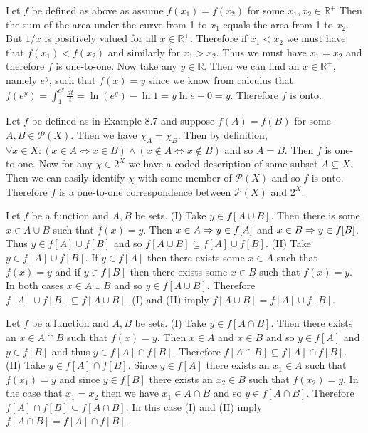 \documentclass[12pt]{book}
\begin{document}
\begin{enumerate}
{Let $f$ be defined as above as assume $f(x_1)=f(x_2)$ for some $x_1,x_2\in\mathbb{R}^+$ Then the sum of the area under the curve from 1 to $x_1$ equals the area from 1 to $x_2$. But $1/x$ is positively valued for all $x\in\mathbb{R}^+$. Therefore if $x_1<x_2$ we must have that $f(x_1)<f(x_2)$ and similarly for $x_1>x_2$. Thus we must have $x_1=x_2$ and therefore $f$ is one-to-one. Now take any $y\in\mathbb{R}$. Then we can find an $x\in\mathbb{R}^+$, namely $e^y$, such that $f(x) = y$ since we know from calculus that $f(e^y) = \int_{1}^{e^y} \frac{dt}{t} = \ln(e^y) - \ln1 = y\ln e - 0 = y$. Therefore $f$ is onto.}

{Let $f$ be defined as in Example 8.7 and suppose $f(A)=f(B)$ for some $A,B\in\mathcal{P}(X)$. Then we have $\chi_A = \chi_B$. Then by definition, $\forall x\in X: (x\in A \iff x\in B)\land (x\notin A \iff x\notin B)$ and so $A=B$. Then $f$ is one-to-one. Now for any $\chi\in 2^X$ we have a coded description of some subset $A\subseteq X$. Then we can easily identify $\chi$ with some member of $\mathcal{P}(X)$ and so $f$ is onto. Therefore $f$ is a one-to-one correspondence between $\mathcal{P}(X)$ and $2^X$.}

{Let $f$ be a function and $A,B$ be sets. (I) Take $y\in f[A\cup B]$. Then there is some $x\in A\cup B$ such that $f(x)=y$. Then $x\in A \Rightarrow y\in f[A]$ and $x\in B \Rightarrow y\in f[B]$. Thus $y\in f[A]\cup f[B]$ and so $f[A\cup B] \subseteq f[A] \cup f[B]$. (II) Take $y\in f[A]\cup f[B]$. If $y\in f[A]$ then there exists some $x\in A$ such that $f(x)=y$ and if $y\in f[B]$ then there exists some $x\in B$ such that $f(x)=y$. In both cases $x\in A\cup B$ and so $y\in f[A\cup B]$. Therefore $f[A]\cup f[B] \subseteq f[A\cup B]$. (I) and (II) imply $f[A\cup B] = f[A] \cup f[B]$.}

{Let $f$ be a function and $A,B$ be sets. (I) Take $y\in f[A\cap B]$. Then there exists an $x\in A\cap B$ such that $f(x)=y$. Then $x\in A$ and $x\in B$ and so $y\in f[A]$ and $y\in f[B]$ and thus $y\in f[A]\cap f[B]$. Therefore $f[A\cap B]\subseteq f[A]\cap f[B]$. (II) Take $y\in f[A]\cap f[B]$. Since $y\in f[A]$ there exists an $x_1\in A$ such that $f(x_1)=y$ and since $y\in f[B]$ there exists an $x_2\in B$ such that $f(x_2)=y$. In the case that $x_1=x_2$ then we have $x_1\in A\cap B$ and so $y\in f[A\cap B]$. Therefore $f[A]\cap f[B]\subseteq f[A\cap B]$. In this case (I) and (II) imply $f[A\cap B] = f[A]\cap f[B]$.}


\end{enumerate}
\end{document}
